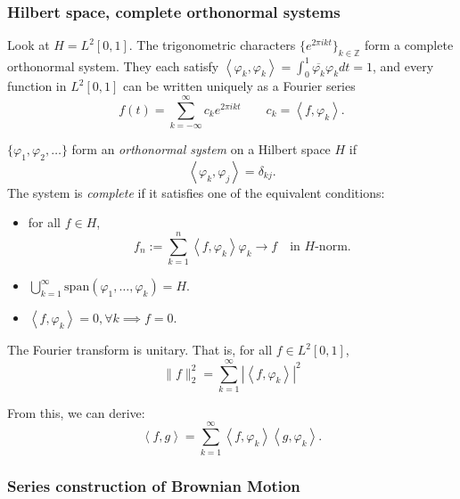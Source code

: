 \subsubsection{Hilbert space, complete orthonormal systems}

\begin{example}
	Look at $H = L^2 [0,1]$. The trigonometric characters $\{e^{2 \pi i k t}\}_{k \in \mathbb{Z}} $ form a complete orthonormal system. They each satisfy $\left\langle \varphi_k, \varphi_k \right\rangle  = \int _{0}^1 \overline{\varphi_k} \varphi_k d t = 1$, and every function in $L^2[0,1]$ can be written uniquely as a Fourier series
	\[
		f(t) = \sum_{k=- \infty }^{\infty} c_k e^{2 \pi i k t} \qquad c_k = \left\langle f, \varphi_k \right\rangle 
	.\] 
\end{example}

\begin{definition}
	$\{\varphi_1, \varphi_2, \ldots\} $ form an \textit{orthonormal system} on a Hilbert space $H$ if 
	\[
		\left\langle \varphi_k, \varphi_j \right\rangle = \delta_{kj}
	.\] 
	The system is \textit{complete} if it satisfies one of the equivalent conditions:
	\begin{itemize}
		\item 
	for all $f \in H$,
	\[
		f_n := \sum_{k = 1}^n \left\langle f, \varphi_k \right\rangle \varphi_k \to  f 
		\quad \text{in $H$-norm}
	.\] 
\item  $\bigcup_{k = 1} ^\infty \text{span}(\varphi_1, \ldots, \varphi_k) = H$.
\item $\left\langle f, \varphi_k \right\rangle = 0, \forall k \implies f = 0$.
	\end{itemize}
\end{definition}

\begin{theorem}
	The Fourier transform is unitary. That is, for all $f \in L^2[0,1]$,
	\[
	\|f\|_2^2 = \sum_{k=1}^{\infty} \left| \left\langle f, \varphi_k \right\rangle  \right| ^2
	\]
\end{theorem}
From this, we can derive:
\[
	\left\langle f, g \right\rangle 
	= \sum_{k=1}^{\infty} \left\langle f, \varphi_k \right\rangle \left\langle g, \varphi_k \right\rangle 
.\] 

\subsubsection{Series construction of Brownian Motion}

